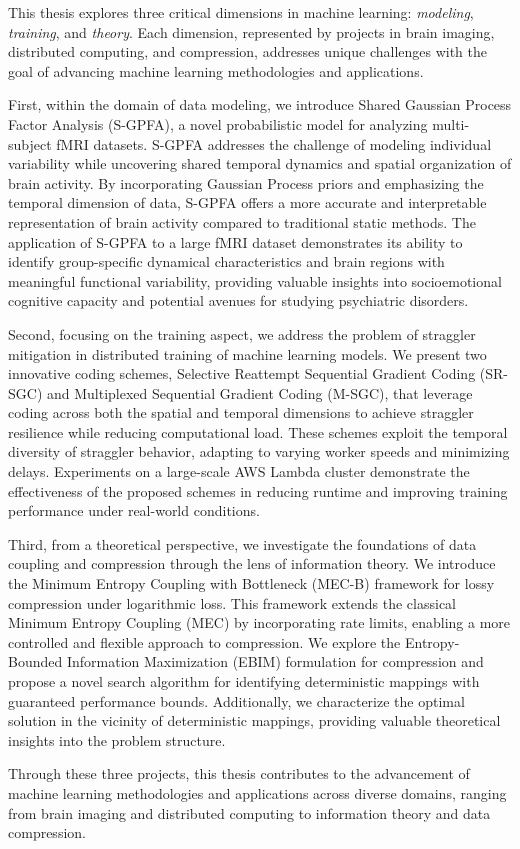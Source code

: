 \begin{spacing}{1.3}

This thesis explores three critical dimensions in machine learning: \textit{modeling}, \textit{training}, and \textit{theory}. Each dimension, represented by projects in brain imaging, distributed computing, and compression, addresses unique challenges with the goal of advancing machine learning methodologies and applications.

First, within the domain of data modeling, we introduce Shared Gaussian Process Factor Analysis (S-GPFA), a novel probabilistic model for analyzing multi-subject fMRI datasets. S-GPFA addresses the challenge of modeling individual variability while uncovering shared temporal dynamics and spatial organization of brain activity. By incorporating Gaussian Process priors and emphasizing the temporal dimension of data, S-GPFA offers a more accurate and interpretable representation of brain activity compared to traditional static methods. The application of S-GPFA to a large fMRI dataset demonstrates its ability to identify group-specific dynamical characteristics and brain regions with meaningful functional variability, providing valuable insights into socioemotional cognitive capacity and potential avenues for studying psychiatric disorders.

Second, focusing on the training aspect, we address the problem of straggler mitigation in distributed training of machine learning models. We present two innovative coding schemes, Selective Reattempt Sequential Gradient Coding (SR-SGC) and Multiplexed Sequential Gradient Coding (M-SGC), that leverage coding across both the spatial and temporal dimensions to achieve straggler resilience while reducing computational load. These schemes exploit the temporal diversity of straggler behavior, adapting to varying worker speeds and minimizing delays. Experiments on a large-scale AWS Lambda cluster demonstrate the effectiveness of the proposed schemes in reducing runtime and improving training performance under real-world conditions.

Third, from a theoretical perspective, we investigate the foundations of data coupling and compression through the lens of information theory. We introduce the Minimum Entropy Coupling with Bottleneck (MEC-B) framework for lossy compression under logarithmic loss. This framework extends the classical Minimum Entropy Coupling (MEC) by incorporating rate limits, enabling a more controlled and flexible approach to compression. We explore the Entropy-Bounded Information Maximization (EBIM) formulation for compression and propose a novel search algorithm for identifying deterministic mappings with guaranteed performance bounds. Additionally, we characterize the optimal solution in the vicinity of deterministic mappings, providing valuable theoretical insights into the problem structure. 

Through these three projects, this thesis contributes to the advancement of machine learning methodologies and applications across diverse domains, ranging from brain imaging and distributed computing to information theory and data compression. 

\end{spacing}